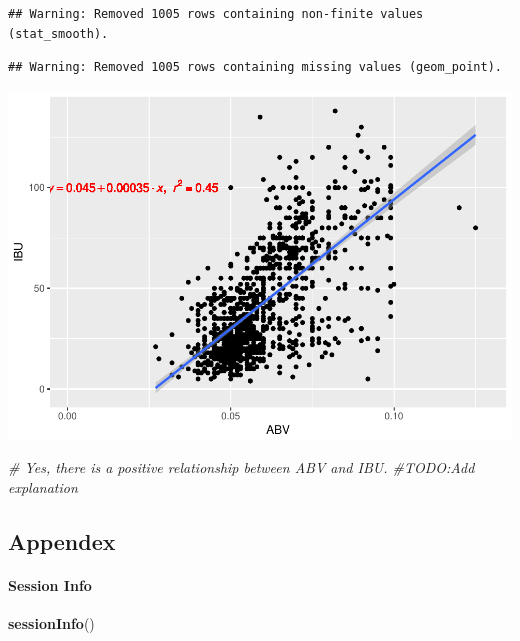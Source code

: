 \documentclass[]{article}
\newenvironment{Shaded}{\begin{snugshade}}{\end{snugshade}}
\newcommand{\KeywordTok}[1]{\textcolor[rgb]{0.13,0.29,0.53}{\textbf{#1}}}
\newcommand{\CommentTok}[1]{\textcolor[rgb]{0.56,0.35,0.01}{\textit{#1}}}
\newcommand{\NormalTok}[1]{#1}
\let\oldparagraph\paragraph
\renewcommand{\paragraph}[1]{\oldparagraph{#1}\mbox{}}
\begin{document}
\begin{verbatim}
## Warning: Removed 1005 rows containing non-finite values (stat_smooth).
\end{verbatim}

\begin{verbatim}
## Warning: Removed 1005 rows containing missing values (geom_point).
\end{verbatim}

\includegraphics{Analysis_Final_files/figure-latex/unnamed-chunk-14-1.pdf}

\begin{Shaded}
\begin{Highlighting}[]
\CommentTok{# Yes, there is a positive relationship between ABV and IBU. #TODO:Add explanation}
\end{Highlighting}
\end{Shaded}

\subsection{Appendex}\label{appendex}

\paragraph{Session Info}\label{session-info}

\begin{Shaded}
\begin{Highlighting}[]
\KeywordTok{sessionInfo}\NormalTok{()}
\end{Highlighting}
\end{Shaded}
\end{document}
